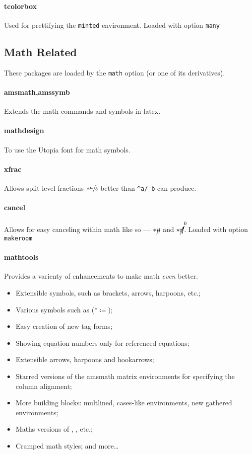 \documentclass[solid,math,chem,code,plot]{bmc}
\begin{document}
\paragraph{\ttfamily tcolorbox}\label{par:tcolorbox}
Used for prettifying the \texttt{minted} environment.
Loaded with option \texttt{many}

\subsection{Math Related}
These packages are loaded by the \texttt{math}
option (or one of its derivatives).

\paragraph{\ttfamily amsmath,amssymb}\label{par:amssymb}
Extends the math commands and symbols in latex.
\paragraph{\ttfamily mathdesign}\label{par:mathdesign}
To use the Utopia font for math symbols.
\paragraph{\ttfamily xfrac}\label{par:xfrac}
Allows split level fractions \(*\sfrac{a}{b}\) better than \texttt{{}^{a}/{}_{b}} can produce.
\paragraph{\ttfamily cancel}\label{par:cancel}
Allows for easy canceling within math like so ---
\(*\cancel{\eta}\) and \(*\cancelto{0}{\eta}\).
Loaded with option \texttt{makeroom}
\paragraph{\ttfamily mathtools}\label{par:mathtools}
Provides a varienty of enhancements to make math \emph{even} better.
\begin{itemize}
    \item Extensible symbols, such as brackets, arrows, harpoons, etc.;
    \item Various symbols such as \texttt{\coloneqq} (\(*\coloneqq\));
    \item Easy creation of new tag forms;
    \item Showing equation numbers only for referenced equations;
    \item Extensible arrows, harpoons and hookarrows;
    \item Starred versions of the amsmath matrix environments for specifying the column alignment;
    \item More building blocks: multlined, cases-like environments, new gathered environments;
    \item Maths versions of \texttt{\makebox}, \texttt{\llap}, \texttt{\rlap} etc.;
    \item Cramped math styles; and more\dots
\end{itemize}
\end{document}
